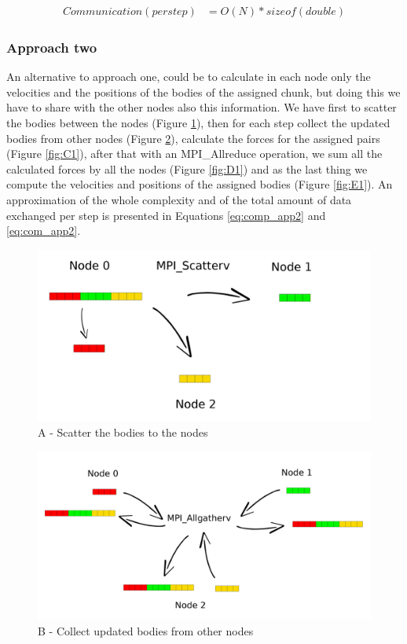 \documentclass[a4paper]{article}
\begin{document}
\begin{equation} \label{eq:com_app1}
\begin{split}
Communication (per step) & = O(N)*sizeof(double)
\end{split}
\end{equation}

\subsubsection{Approach two}
\label{sec:app_1}
An alternative to approach one, could be to calculate in each node only the velocities and the positions of the bodies of the assigned chunk, but doing this we have to share with the other nodes also this information.
We have first to scatter the bodies between the nodes (Figure \ref{fig:A1}), then for each step collect the updated bodies from other nodes (Figure \ref{fig:B1}), calculate the forces for the assigned pairs (Figure \ref{fig:C1}), after that with an MPI\_Allreduce operation, we sum all the calculated forces by all the nodes (Figure \ref{fig:D1}) and as the last thing we compute the velocities and positions of the assigned bodies (Figure \ref{fig:E1}).
An approximation of the whole complexity and of the total amount of data exchanged per step is presented in Equations \ref{eq:comp_app2} and \ref{eq:com_app2}.

\begin{figure}[ht]
  \centering
  \includegraphics[width=0.6\linewidth]{scatter}
  \caption{A - Scatter the bodies to the nodes}
  \label{fig:A1}
\end{figure}
\FloatBarrier

\begin{figure}[ht]
  \centering
  \includegraphics[width=0.6\linewidth]{MPI_all_gather}
  \caption{B - Collect updated bodies from other nodes}
  \label{fig:B1}
\end{figure}
\FloatBarrier
\end{document}
